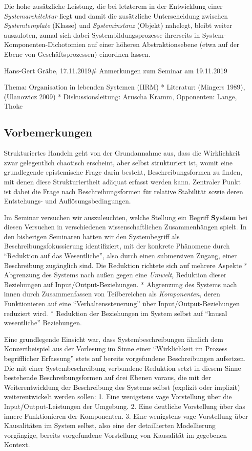 \documentclass[11pt,a4paper]{article}
\begin{document}
Die hohe zusätzliche Leistung, die bei letzterem in der Entwicklung
einer \emph{Systemarchitektur} liegt und damit die zusätzliche
Unterscheidung zwischen \emph{Systemtemplate} (Klasse) und
\emph{Systeminstanz} (Objekt) nahelegt, bleibt weiter auszuloten, zumal
sich dabei Systembildungsprozesse ihrerseits in
System-Komponenten-Dichotomien auf einer höheren Abstraktionsebene (etwa
auf der Ebene von Geschäftsprozessen) einordnen lassen.

Hans-Gert Gräbe, 17.11.2019\# Anmerkungen zum Seminar am 19.11.2019

Thema: Organisation in lebenden Systemen (IIRM) * Literatur: (Mingers
1989), (Ulanowicz 2009) * Diskussionsleitung: Aruscha Kramm, Opponenten:
Lange, Thoke

\hypertarget{vorbemerkungen}{%
\subsection{Vorbemerkungen}\label{vorbemerkungen}}

Strukturiertes Handeln geht von der Grundannahme aus, dass die
Wirklichkeit zwar gelegentlich chaotisch erscheint, aber selbst
strukturiert ist, womit eine grundlegende epistemische Frage darin
besteht, Beschreibungsformen zu finden, mit denen diese Strukturiertheit
adäquat erfasst werden kann. Zentraler Punkt ist dabei die Frage nach
Beschreibungsformen für relative Stabilität sowie deren Entstehungs- und
Auflösungsbedingungen.

Im Seminar versuchen wir auszuleuchten, welche Stellung ein Begriff
\textbf{System} bei diesen Versuchen in verschiedenen wissenschaftlichen
Zusammenhängen spielt. In den bisherigen Seminaren hatten wir den
Systembegriff als Beschreibungsfokussierung identifiziert, mit der
konkrete Phänomene durch ``Reduktion auf das Wesentliche'', also durch
einen submersiven Zugang, einer Beschreibung zugänglich sind. Die
Reduktion richtete sich auf mehrere Aspekte * Abgrenzung des Systems
nach außen gegen eine \emph{Umwelt}, Reduktion dieser Beziehungen auf
Input/Output-Beziehungen. * Abgrenzung des Systems nach innen durch
Zusammenfassen von Teilbereichen als \emph{Komponenten}, deren
Funktionieren auf eine ``Verhaltenssteuerung'' über
Input/Output-Beziehungen reduziert wird. * Reduktion der Beziehungen im
System selbst auf ``kausal wesentliche'' Beziehungen.

Eine grundlegende Einsicht war, dass Systembeschreibungen ähnlich dem
Konzertbeispiel aus der Vorlesung im Sinne einer ``Wirklichkeit im
Prozess begrifflicher Erfassung'' stets auf bereits vorgefundene
Beschreibungen aufsetzen. Die mit einer Systembeschreibung verbundene
Reduktion setzt in diesem Sinne bestehende Beschreibungsformen auf drei
Ebenen voraus, die mit der Weiterentwicklung der Beschreibung des
Systems selbst (explizit oder implizit) weiterentwickelt werden sollen:
1. Eine wenigstens vage Vorstellung über die Input/Output-Leistungen der
Umgebung. 2. Eine deutliche Vorstellung über das innere Funktionieren
der Komponenten. 3. Eine wenigstens vage Vorstellung über Kausalitäten
im System selbst, also eine der detaillierten Modellierung vorgängige,
bereits vorgefundene Vorstellung von Kausalität im gegebenen Kontext.
\end{document}
